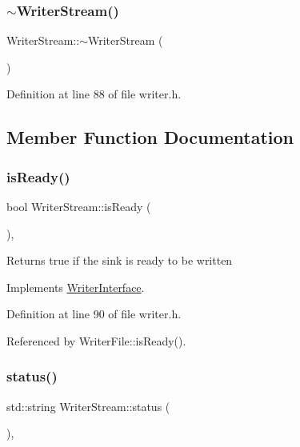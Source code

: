 \subsubsection{\texorpdfstring{$\sim$\+Writer\+Stream()}{~WriterStream()}}
{\footnotesize\ttfamily Writer\+Stream\+::$\sim$\+Writer\+Stream (\begin{DoxyParamCaption}{ }\end{DoxyParamCaption})\hspace{0.3cm}{\ttfamily [inline]}}



Definition at line 88 of file writer.\+h.



\subsection{Member Function Documentation}
\mbox{\label{classWriterStream_a32e6913d45c7e67e60c0787c7a3e9467}} 
\subsubsection{\texorpdfstring{is\+Ready()}{isReady()}}
{\footnotesize\ttfamily bool Writer\+Stream\+::is\+Ready (\begin{DoxyParamCaption}{ }\end{DoxyParamCaption})\hspace{0.3cm}{\ttfamily [inline]}, {\ttfamily [virtual]}}

\begin{DoxyReturn}{Returns}
true if the sink is ready to be written 
\end{DoxyReturn}


Implements \hyperlink{classWriterInterface_ada0c58dbea3bc216a1a687b070f2a924}{Writer\+Interface}.



Definition at line 90 of file writer.\+h.



Referenced by Writer\+File\+::is\+Ready().

\mbox{\label{classWriterStream_ac5da94332707b311cb43b06c9356afce}} 
\subsubsection{\texorpdfstring{status()}{status()}}
{\footnotesize\ttfamily std\+::string Writer\+Stream\+::status (\begin{DoxyParamCaption}{ }\end{DoxyParamCaption})\hspace{0.3cm}{\ttfamily [inline]}, {\ttfamily [virtual]}}

